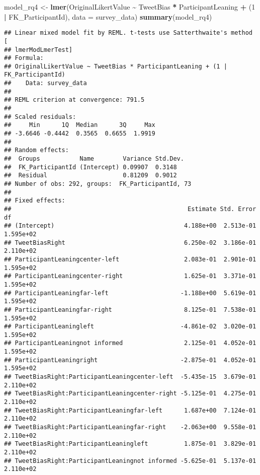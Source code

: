 \documentclass[
]{article}
\newenvironment{Shaded}{\begin{snugshade}}{\end{snugshade}}
\newcommand{\AttributeTok}[1]{\textcolor[rgb]{0.13,0.29,0.53}{#1}}
\newcommand{\DecValTok}[1]{\textcolor[rgb]{0.00,0.00,0.81}{#1}}
\newcommand{\FunctionTok}[1]{\textcolor[rgb]{0.13,0.29,0.53}{\textbf{#1}}}
\newcommand{\NormalTok}[1]{#1}
\newcommand{\OtherTok}[1]{\textcolor[rgb]{0.56,0.35,0.01}{#1}}
\newcommand{\SpecialCharTok}[1]{\textcolor[rgb]{0.81,0.36,0.00}{\textbf{#1}}}
\begin{document}
\begin{Shaded}
\begin{Highlighting}[]
\NormalTok{model\_rq4 }\OtherTok{\textless{}{-}} \FunctionTok{lmer}\NormalTok{(OriginalLikertValue }\SpecialCharTok{\textasciitilde{}}\NormalTok{ TweetBias }\SpecialCharTok{*}\NormalTok{ ParticipantLeaning }\SpecialCharTok{+} 
\NormalTok{                  (}\DecValTok{1} \SpecialCharTok{|}\NormalTok{ FK\_ParticipantId), }\AttributeTok{data =}\NormalTok{ survey\_data)}
\FunctionTok{summary}\NormalTok{(model\_rq4)}
\end{Highlighting}
\end{Shaded}

\begin{verbatim}
## Linear mixed model fit by REML. t-tests use Satterthwaite's method [
## lmerModLmerTest]
## Formula: 
## OriginalLikertValue ~ TweetBias * ParticipantLeaning + (1 | FK_ParticipantId)
##    Data: survey_data
## 
## REML criterion at convergence: 791.5
## 
## Scaled residuals: 
##     Min      1Q  Median      3Q     Max 
## -3.6646 -0.4442  0.3565  0.6655  1.9919 
## 
## Random effects:
##  Groups           Name        Variance Std.Dev.
##  FK_ParticipantId (Intercept) 0.09907  0.3148  
##  Residual                     0.81209  0.9012  
## Number of obs: 292, groups:  FK_ParticipantId, 73
## 
## Fixed effects:
##                                                 Estimate Std. Error         df
## (Intercept)                                    4.188e+00  2.513e-01  1.595e+02
## TweetBiasRight                                 6.250e-02  3.186e-01  2.110e+02
## ParticipantLeaningcenter-left                  2.083e-01  2.901e-01  1.595e+02
## ParticipantLeaningcenter-right                 1.625e-01  3.371e-01  1.595e+02
## ParticipantLeaningfar-left                    -1.188e+00  5.619e-01  1.595e+02
## ParticipantLeaningfar-right                    8.125e-01  7.538e-01  1.595e+02
## ParticipantLeaningleft                        -4.861e-02  3.020e-01  1.595e+02
## ParticipantLeaningnot informed                 2.125e-01  4.052e-01  1.595e+02
## ParticipantLeaningright                       -2.875e-01  4.052e-01  1.595e+02
## TweetBiasRight:ParticipantLeaningcenter-left  -5.435e-15  3.679e-01  2.110e+02
## TweetBiasRight:ParticipantLeaningcenter-right -5.125e-01  4.275e-01  2.110e+02
## TweetBiasRight:ParticipantLeaningfar-left      1.687e+00  7.124e-01  2.110e+02
## TweetBiasRight:ParticipantLeaningfar-right    -2.063e+00  9.558e-01  2.110e+02
## TweetBiasRight:ParticipantLeaningleft          1.875e-01  3.829e-01  2.110e+02
## TweetBiasRight:ParticipantLeaningnot informed -5.625e-01  5.137e-01  2.110e+02

\end{verbatim}
\end{document}
